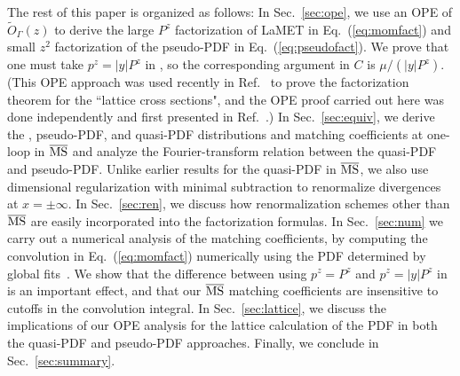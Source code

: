 The rest of this paper is organized as follows: In Sec.~\ref{sec:ope}, we use an OPE of $\tilde{O}_\Gamma(z)$ to derive the large $P^z$ factorization of LaMET in Eq.~(\ref{eq:momfact}) and small $z^2$ factorization of the pseudo-PDF in Eq.~(\ref{eq:pseudofact}). We prove that one must take $p^z=|y|P^z$ in , so the corresponding argument in $C$ is $\mu/(|y|P^z)$.
(This OPE approach was used recently in Ref.~\cite{Ma:2017pxb} to prove the factorization theorem for the ``lattice cross sections", and the OPE proof carried out here was done independently and first presented in Ref.~\cite{Zhao:2017int}.)
%
In Sec.~\ref{sec:equiv}, we derive the \spcorr, pseudo-PDF, and quasi-PDF distributions and matching coefficients at one-loop in $\overline{\rm MS}$ and analyze the Fourier-transform relation between the quasi-PDF and pseudo-PDF. Unlike earlier results for the quasi-PDF in $\overline{\rm MS}$, we also use dimensional regularization with minimal subtraction to renormalize divergences at $x=\pm\infty$. In Sec.~\ref{sec:ren}, we discuss how renormalization schemes other than $\overline{\rm MS}$ are easily incorporated into the factorization formulas.
%
In Sec.~\ref{sec:num} we carry out a numerical analysis of the matching coefficients, by computing the convolution in Eq.~(\ref{eq:momfact}) numerically using the PDF determined by global fits~\cite{Martin:2009iq}. We show that the difference between using $p^z=P^z$ and $p^z=|y|P^z$ in  is an important effect, and that our $\overline{\rm MS}$ matching coefficients are insensitive to cutoffs in the convolution integral. In Sec.~\ref{sec:lattice}, we discuss the implications of our OPE analysis for the lattice calculation of the PDF in both the quasi-PDF and pseudo-PDF approaches. Finally, we conclude in Sec.~\ref{sec:summary}.
